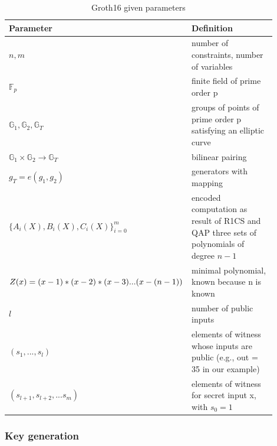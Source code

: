 \setlength{\tabcolsep}{2ex}
\renewcommand{\arraystretch}{1.5}%
\begin{table}[hbt]
	\centering
	    \caption{Groth16 given parameters}
		\begin{tabular}{| m{0.3\linewidth} | m{0.6\linewidth} |}
		\hline
		\textbf{Parameter} & \textbf{Definition}\\ \hline
            \(n,m\) & number of constraints, number of variables\\ \hline
            \begin{math}\mathbb{F}_p\end{math} & finite field of prime order p\\ \hline 
            \begin{math}\mathbb{G}_1, \mathbb{G}_2, \mathbb{G}_T\end{math} & groups of points of prime order p satisfying an elliptic curve\\ \hline
            \begin{math}\mathbb{G}_1 \times \mathbb{G}_2 \to \mathbb{G}_T\end{math}& bilinear pairing \\ \hline
            \begin{math}g_T = e(g_1, g_2)\end{math}& generators with mapping \\\hline
            \begin{math}\bigl\{A_i(X), B_i(X), C_i(X)\bigl\}_{i=0}^m\end{math} & encoded computation as result of R1CS and QAP three sets of polynomials of degree \(n-1\)\\ \hline
            \(Z(x) = (x-1)*(x-2) * \newline (x-3)...(x-(n-1))\) &  minimal polynomial, known because n is known \\ \hline
            \(l\) & number of public inputs \\ \hline
            \((s_1,...,s_l)\) & elements of witness whose inputs are public \newline (e.g., out = 35 in our example) \\ \hline
            \((s_{l+1},s_{l+2},...s_m)\) & elements of witness for secret input x, with \(s_0 = 1\) \\ \hline
	\end{tabular}
\label{tab:Groth16Params}
\end{table}

\subsubsection{Key generation}

